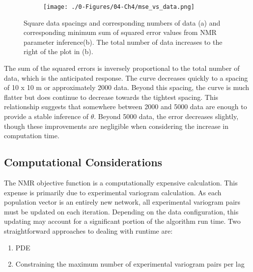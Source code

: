 \begin{figure}
    \begin{subtable}{.5\textwidth}
        \centering
        \resizebox{1\width}{!}{}
        \caption{}
        \label{tab:syn_data}
    \end{subtable}
    \begin{subfigure}{.5\textwidth}
        \centering
        \texttt{[image: ./0-Figures/04-Ch4/mse\_vs\_data.png]}
        \caption{}
        \label{fig:mse_vs_data_plot}
    \end{subfigure}
    \caption{Square data spacings and corresponding numbers of data (a) and corresponding minimum sum of squared error values from \gls{NMR} parameter inference(b). The total number of data increases to the right of the plot in (b). }
    \label{fig:mse_vs_data}
\end{figure}

The sum of the squared errors is inversely proportional to the total number of data, which is the anticipated response. The curve decreases quickly to a spacing of 10 x 10 m or approximately 2000 data. Beyond this spacing, the curve is much flatter but does continue to decrease towards the tightest spacing. This relationship suggests that somewhere between 2000 and 5000 data are enough to provide a stable inference of $\theta$. Beyond 5000 data, the error decreases slightly, though these improvements are negligible when considering the increase in computation time.

\subsection{Computational Considerations}
\label{subsec:04comp}

The NMR objective function is a computationally expensive calculation. This expense is primarily due to experimental variogram calculation. As each population vector is an entirely new network, all experimental variogram pairs must be updated on each iteration. Depending on the data configuration, this updating may account for a significant portion of the algorithm run time. Two straightforward approaches to dealing with runtime are:
\begin{enumerate}
    \item \Gls{PDE}
    \item Constraining the maximum number of experimental variogram pairs per lag
\end{enumerate}


